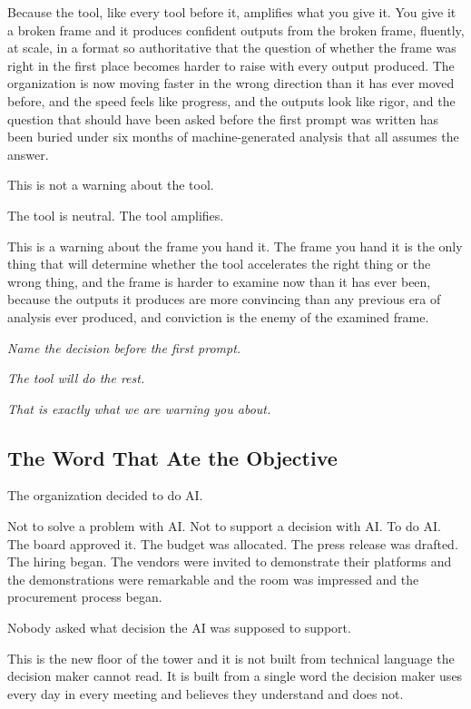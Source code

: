 Because the tool, like every tool before it, amplifies what you give it. You give it a broken frame and it produces confident outputs from the broken frame, fluently, at scale, in a format so authoritative that the question of whether the frame was right in the first place becomes harder to raise with every output produced. The organization is now moving faster in the wrong direction than it has ever moved before, and the speed feels like progress, and the outputs look like rigor, and the question that should have been asked before the first prompt was written has been buried under six months of machine-generated analysis that all assumes the answer.

This is not a warning about the tool.

The tool is neutral. The tool amplifies.

This is a warning about the frame you hand it. The frame you hand it is the only thing that will determine whether the tool accelerates the right thing or the wrong thing, and the frame is harder to examine now than it has ever been, because the outputs it produces are more convincing than any previous era of analysis ever produced, and conviction is the enemy of the examined frame.

\textit{Name the decision before the first prompt.}

\textit{The tool will do the rest.}

\textit{That is exactly what we are warning you about.}

\subsection*{The Word That Ate the Objective}

The organization decided to do AI.

Not to solve a problem with AI. Not to support a decision with AI. To do AI. The board approved it. The budget was allocated. The press release was drafted. The hiring began. The vendors were invited to demonstrate their platforms and the demonstrations were remarkable and the room was impressed and the procurement process began.

Nobody asked what decision the AI was supposed to support.

This is the new floor of the tower and it is not built from technical language the decision maker cannot read. It is built from a single word the decision maker uses every day in every meeting and believes they understand and does not.

